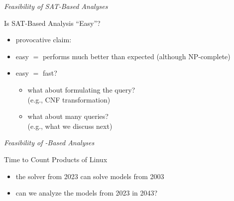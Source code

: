 \begin{frame}{\myframetitle}
	\begin{fancycolumns}[t]
		\emph{Feasibility of SAT-Based Analyses}

		\begin{note}{Is SAT-Based Analysis ``Easy''?}
			\begin{itemize}
				\item provocative claim:  
				\item easy $=$ performs much better than expected (although NP-complete)
				\item easy $=$ fast?
				\begin{itemize}
					\item what about formulating the query?\\
						(e.g., CNF transformation)
					\item what about many queries?\\
						(e.g., what we discuss next)
				\end{itemize}
			\end{itemize}
		\end{note}
	\nextcolumn
		\emph{Feasibility of \ssat{}-Based Analyses}
	
		\begin{exampletight}{Time to Count Products of Linux}
			\\[-3mm]
			\begin{itemize}
				\item the solver from 2023 can solve models from 2003 %
				\item can we analyze the models from 2023 in 2043?
			\end{itemize}
		\end{exampletight}
	\end{fancycolumns}
\end{frame}



